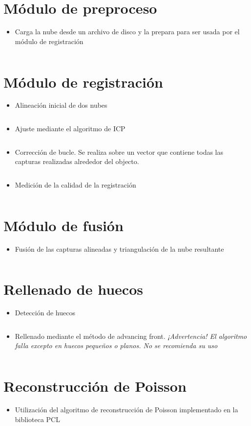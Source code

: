	\section{Módulo de preproceso}
	\begin{itemize}
		\item Carga la nube desde un archivo de disco y la prepara para ser usada por el módulo de registración
	\inputminted{cpp}{code/preproceso.cpp}
	\end{itemize}

	\section{Módulo de registración}
	\begin{itemize}
		\item Alineación inicial de dos nubes
			\inputminted{cpp}{code/pairwise_reg.cpp}

		\item Ajuste mediante el algoritmo de ICP
			\inputminted{cpp}{code/pairwise_icp.cpp}

		\item Corrección de bucle.
			Se realiza sobre un vector que contiene todas las capturas realizadas alrededor del objecto.
			\inputminted{cpp}{code/loop.cpp}

		\item Medición de la calidad de la registración
			\inputminted{cpp}{code/fitness.cpp}
	\end{itemize}

	\section{Módulo de fusión}
	\begin{itemize}
		\item Fusión de las capturas alineadas y triangulación de la nube resultante
			\inputminted{cpp}{code/fusion.cpp}
	\end{itemize}

	\section{Rellenado de huecos}
	\begin{itemize}
		\item Detección de huecos
			\inputminted{cpp}{code/holes.cpp}

		\item Rellenado mediante el método de advancing front.
			\emph{¡Advertencia! El algoritmo falla excepto en huecos pequeños o planos.
			No se recomienda su uso}
			\inputminted{cpp}{code/adv_front.cpp}
	\end{itemize}

	\section{Reconstrucción de Poisson}
	\begin{itemize}
		\item Utilización del algoritmo de reconstrucción de Poisson implementado en la biblioteca PCL
			\inputminted{cpp}{code/poisson.cpp}
	\end{itemize}
